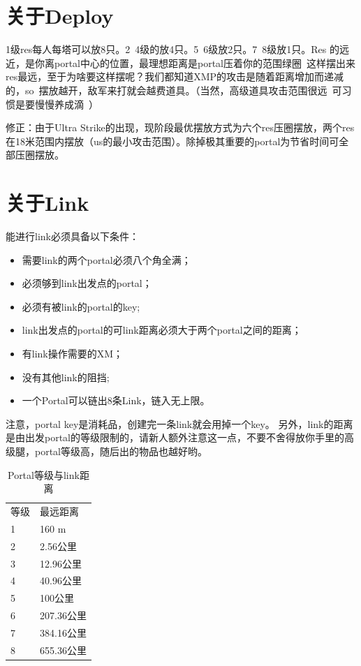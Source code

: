 \documentclass[12pt]{article}
\theoremstyle{definition}
\theoremstyle{remark}
\numberwithin{equation}{section}
\begin{document}
\section{关于Deploy}
1级res每人每塔可以放8只。2~4级的放4只。5~6级放2只。7~8级放1只。Res 的远近，是你离portal中心的位置，最理想距离是portal压着你的范围绿圈~这样摆出来res最远，至于为啥要这样摆呢？我们都知道XMP的攻击是随着距离增加而递减的，so~摆放越开，敌军来打就会越费道具。（当然，高级道具攻击范围很远~可习惯是要慢慢养成滴~）\par
修正：由于Ultra Strike的出现，现阶段最优摆放方式为六个res压圈摆放，两个res在18米范围内摆放（us的最小攻击范围）。除掉极其重要的portal为节省时间可全部压圈摆放。

\section{关于Link}
能进行link必须具备以下条件：
\begin{itemize}
\item 需要link的两个portal必须八个角全满；
\item 必须够到link出发点的portal；
\item 必须有被link的portal的key;
\item link出发点的portal的可link距离必须大于两个portal之间的距离；
\item 有link操作需要的XM；
\item 没有其他link的阻挡;
\item 一个Portal可以链出8条Link，链入无上限。
\end{itemize}
注意，portal key是消耗品，创建完一条link就会用掉一个key。
另外，link的距离是由出发portal的等级限制的，请新人额外注意这一点，不要不舍得放你手里的高级腿，portal等级高，随后出的物品也越好哟。 \par
\begin{table}
\begin{center}
\caption{Portal等级与link距离}
\begin{tabular}{ll}
等级 & 最远距离 \\
1 & 160 m \\
2 & 2.56公里  \\
3 & 12.96公里 \\
4 & 40.96公里 \\
5 & 100公里   \\
6 & 207.36公里\\
7 & 384.16公里\\
8 & 655.36公里
\end{tabular}
\end{center}
\end{table}
\end{document}
